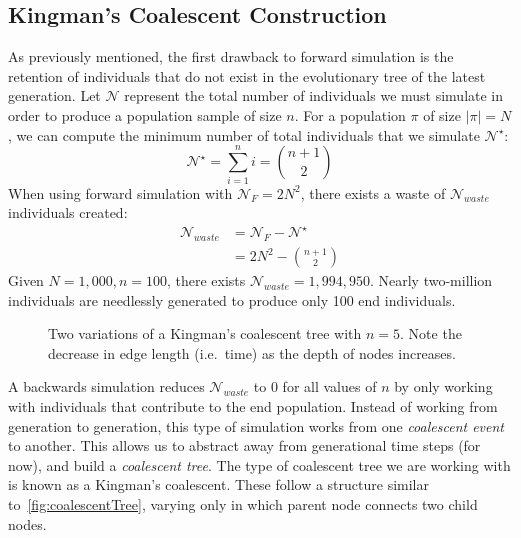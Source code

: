 \subsection{Kingman's Coalescent Construction}\label{subsec:kingmanCoalescentConstruction}
As previously mentioned, the first drawback to forward simulation is the retention of individuals that do not exist in
the evolutionary tree of the latest generation.
Let $\mathcal{N}$ represent the total number of individuals we must simulate in order to produce a population sample of
size $n$.
For a population $\pi$ of size $|\pi| = N$, we can compute the minimum number of total individuals that we simulate
$\mathcal{N}^\star$:
\begin{equation}
    \mathcal{N}^\star = \sum_{i=1}^n i = \binom{n + 1}{2}
\end{equation}
When using forward simulation with $\mathcal{N}_{F} = 2N^2$, there exists a waste of
$\mathcal{N}_{waste}$ individuals created:
\begin{equation}
    \begin{aligned}
        \mathcal{N}_{{waste}} &= \mathcal{N}_{F} - \mathcal{N}^\star \\
        &= 2N^2 - \binom{n + 1}{2}
    \end{aligned}
\end{equation}
Given $N = 1,000, n = 100$, there exists $\mathcal{N}_{waste} = 1,994,950$.
Nearly two-million individuals are needlessly generated to produce only 100 end individuals.

\begin{figure}[t]
    \centering
    \subfloat{}
    \qquad \qquad \qquad
    \subfloat{}
    \caption{Two variations of a Kingman's coalescent tree with $n = 5$.
    Note the decrease in edge length (i.e.\ time) as the depth of nodes increases.}
    \label{fig:coalescentTree}
\end{figure}

A backwards simulation reduces $\mathcal{N}_{waste}$ to 0 for all values of $n$ by only working with individuals
that contribute to the end population.
Instead of working from generation to generation, this type of simulation works from one \emph{coalescent event} to
another.
This allows us to abstract away from generational time steps (for now), and build a \emph{coalescent tree}.
The type of coalescent tree we are working with is known as a Kingman's coalescent.
These follow a structure similar to~\autoref{fig:coalescentTree}, varying only in which parent node connects two child
nodes.

